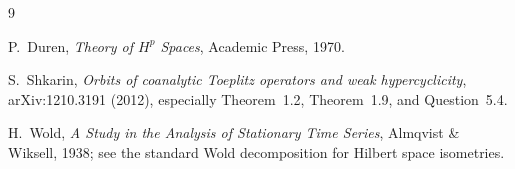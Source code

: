 \documentclass[11pt]{article}
\begin{document}
\begin{thebibliography}{9}

P.~Duren,
\emph{Theory of $H^p$ Spaces},
Academic Press, 1970.

S.~Shkarin,
\emph{Orbits of coanalytic Toeplitz operators and weak hypercyclicity},
arXiv:1210.3191 (2012), especially Theorem~1.2, Theorem~1.9, and
Question~5.4.

H.~Wold,
\emph{A Study in the Analysis of Stationary Time Series},
Almqvist \& Wiksell, 1938; see the standard Wold decomposition for Hilbert
space isometries.

\end{thebibliography}
\end{document}
